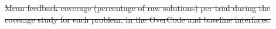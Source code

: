 \documentclass[12pt,twoside]{mitthesis}
\providecommand{\DIFdeltex}[1]{{\protect\color{red}\sout{#1}}}                      %
\providecommand{\DIFdelbegin}{} %
\providecommand{\DIFdelend}{} %
\providecommand{\DIFdelFL}[1]{\DIFdel{#1}} %
\providecommand{\DIFdel}[1]{\texorpdfstring{\DIFdeltex{#1}}{}} %
\begin{document}
\DIFdelbegin %
\DIFdelend %

\DIFdelbegin %
{%
\DIFdelFL{Mean feedback coverage (percentage of raw solutions) per trial during the coverage study for each problem, in the OverCode and baseline interfaces.}}
\end{document}
